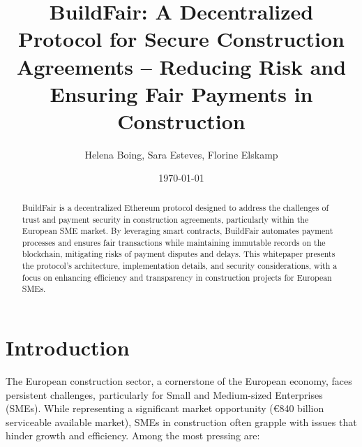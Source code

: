\documentclass[12pt]{article}
\title{BuildFair: A Decentralized Protocol for Secure Construction Agreements -- Reducing Risk and Ensuring Fair Payments in Construction}
\author{Helena Boing, Sara Esteves, Florine Elskamp}
\date{\today}
\begin{document}
\maketitle

\begin{abstract}
BuildFair is a decentralized Ethereum protocol designed to address the challenges of trust and payment security in construction agreements, particularly within the European SME market. By leveraging smart contracts, BuildFair automates payment processes and ensures fair transactions while maintaining immutable records on the blockchain, mitigating risks of payment disputes and delays. This whitepaper presents the protocol's architecture, implementation details, and security considerations, with a focus on enhancing efficiency and transparency in construction projects for European SMEs.
\end{abstract}

\newpage

\tableofcontents

\newpage

\section{Introduction}
The European construction sector, a cornerstone of the European economy, faces persistent challenges, particularly for Small and Medium-sized Enterprises (SMEs). While representing a significant market opportunity (€840 billion serviceable available market\cite{nextmsc_analysis}), SMEs in construction often grapple with issues that hinder growth and efficiency. Among the most pressing are:
\end{document}
